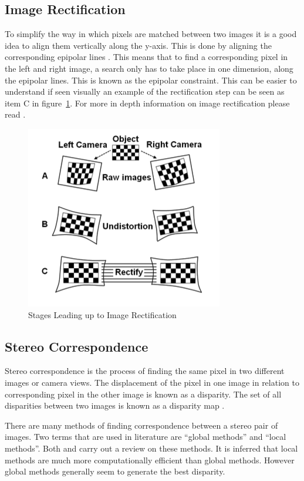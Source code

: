\documentclass[11pt,oneside]{report}
\begin{document}
				\subsection{Image Rectification}
				 	To simplify the way in which pixels are matched between two images it is a good idea to align them vertically along the y-axis.
				 	This is done by aligning the corresponding epipolar lines .
					This means that to find a corresponding pixel in the left and right image, a search only has to take place in one dimension, along the epipolar lines.
					This is known as the epipolar constraint.
					This can be easier to understand if seen visually an example of the rectification step can be seen as item C in figure~\ref{fig:rect}.
					For more in depth information on image rectification please read .
				\begin{figure}
				\centering
					\includegraphics[scale=0.5]{rect_proc}
					\caption{Stages Leading up to Image Rectification \protect\cite{pap:rect} {\label{fig:rect}}}

				\end{figure}
				
				\subsection{Stereo Correspondence}
					Stereo correspondence is the process of finding the same pixel in two different images or camera views.
					The displacement of the pixel in one image in relation to corresponding pixel in the other image is known as a disparity.
					The set of all disparities between two images is known as a disparity map \cite{journal:matchers}.
					
					There are many methods of finding correspondence between a stereo pair of images.
					Two terms that are used in literature are ``global methods'' and ``local methods''.
					Both  and  carry out a review on these methods.
					It is inferred that local methods are much more computationally efficient than global methods.
					However global methods generally seem to generate the best disparity.
					
\end{document}
